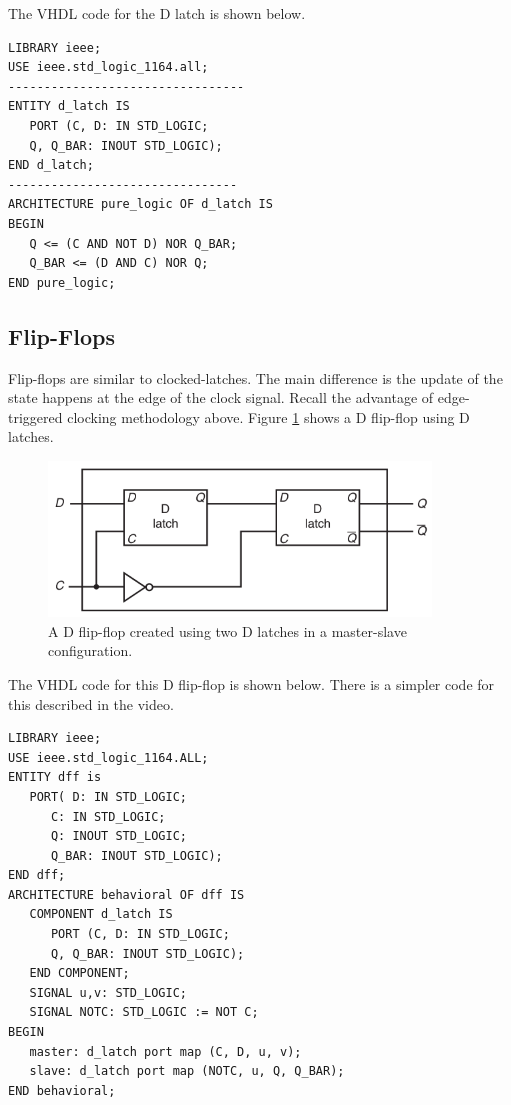 \documentclass[a4paper, 11pt,oneside]{article}
\begin{document}
The VHDL code for the D latch is shown below. 

\begin{verbatim}
LIBRARY ieee;
USE ieee.std_logic_1164.all;
---------------------------------
ENTITY d_latch IS
   PORT (C, D: IN STD_LOGIC;
   Q, Q_BAR: INOUT STD_LOGIC);
END d_latch;
--------------------------------
ARCHITECTURE pure_logic OF d_latch IS
BEGIN
   Q <= (C AND NOT D) NOR Q_BAR;
   Q_BAR <= (D AND C) NOR Q;
END pure_logic;
\end{verbatim}

\subsection{Flip-Flops}
Flip-flops are similar to clocked-latches. The main difference is the 
update of the state happens at the edge of the clock signal. Recall the
advantage of edge-triggered clocking methodology above. Figure \ref{fig:dff0} 
shows a D flip-flop using D latches.

\begin{figure}[H]
	\begin{center}
	\includegraphics[width=4in]{dff0.png}
	\caption{A D flip-flop created using two D latches in a master-slave 
	configuration.}
	\label{fig:dff0} 
	\end{center}
\end{figure}

The VHDL code for this D flip-flop is shown below. There is a simpler code for
this described in the video.

\begin{verbatim}
LIBRARY ieee;
USE ieee.std_logic_1164.ALL;
ENTITY dff is
   PORT( D: IN STD_LOGIC;
      C: IN STD_LOGIC;
      Q: INOUT STD_LOGIC;
      Q_BAR: INOUT STD_LOGIC);
END dff;
ARCHITECTURE behavioral OF dff IS
   COMPONENT d_latch IS
      PORT (C, D: IN STD_LOGIC;
      Q, Q_BAR: INOUT STD_LOGIC);
   END COMPONENT;
   SIGNAL u,v: STD_LOGIC;
   SIGNAL NOTC: STD_LOGIC := NOT C;
BEGIN
   master: d_latch port map (C, D, u, v);
   slave: d_latch port map (NOTC, u, Q, Q_BAR);
END behavioral;
\end{verbatim}
\end{document}
